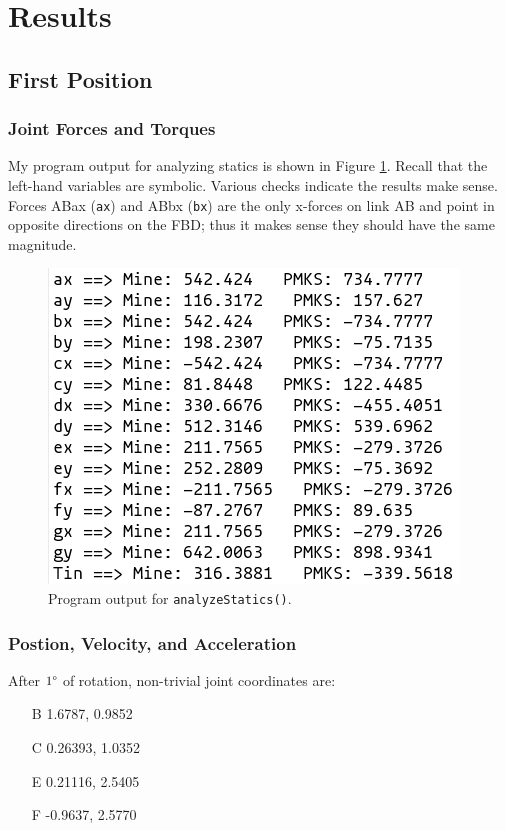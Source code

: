 \documentclass[12pt]{article}
\begin{document}
\section{Results}%
\label{res}

\subsection{First Position}%
\label{res.first}

\subsubsection{Joint Forces and Torques}%
\label{res.first.joints}

My program output for analyzing statics is shown in Figure \ref{fig:static-forces}. Recall that the left-hand variables are symbolic. Various checks indicate the results make sense. Forces ABax (\texttt{ax}) and ABbx (\texttt{bx}) are the only x-forces on link AB and point in opposite directions on the FBD; thus it makes sense they should have the same magnitude.

\begin{figure}[ht]
  \centering
  \includegraphics[scale=0.6]{../static-forces.png}
  \caption{\label{fig:static-forces}Program output for \texttt{analyzeStatics()}.}
\end{figure}

\subsubsection{Postion, Velocity, and Acceleration}%
\label{res.first.kin}

After $1\degree$ of rotation, non-trivial joint coordinates are:
\begin{enumerate}
        \item[B]  1.6787,  0.9852
        \item[C]  0.26393, 1.0352
        \item[E]  0.21116, 2.5405
        \item[F] -0.9637,  2.5770
\end{enumerate}
\bigskip
\end{document}
